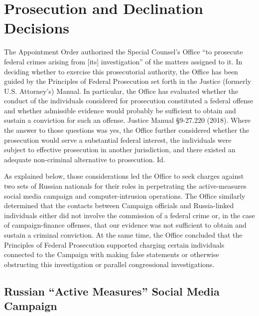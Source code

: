 \section{Prosecution and Declination Decisions}
The Appointment Order authorized the Special Counsel's Office ``to prosecute federal crimes arising from [its] investigation'' of the matters assigned to it. 
In deciding whether to exercise this prosecutorial authority, the Office has been guided by the Principles of Federal Prosecution set forth in the Justice (formerly U.S. Attorney's) Manual. 
In particular, the Office has evaluated whether the conduct of the individuals considered for prosecution constituted a federal offense and whether admissible evidence would probably be sufficient to obtain and sustain a conviction for such an offense. 
Justice Manual \S 9-27.220 (2018). 
Where the answer to those questions was yes, the Office further considered whether the prosecution would serve a substantial federal interest, the individuals were subject to effective prosecution in another jurisdiction, and there existed an adequate non-criminal alternative to prosecution. 
Id.

As explained below, those considerations led the Office to seek charges against two sets of Russian nationals for their roles in perpetrating the active-measures social media campaign and computer-intrusion operations.
The Office similarly determined that the contacts between Campaign officials and Russia-linked individuals either did not involve the commission of a federal crime or, in the case of campaign-finance offenses, that our evidence was not sufficient to obtain and sustain a criminal conviction. 
At the same time, the Office concluded that the Principles of Federal Prosecution supported charging certain individuals connected to the Campaign with making false statements or otherwise obstructing this investigation or parallel congressional investigations.

\subsection{Russian ``Active Measures'' Social Media Campaign}

